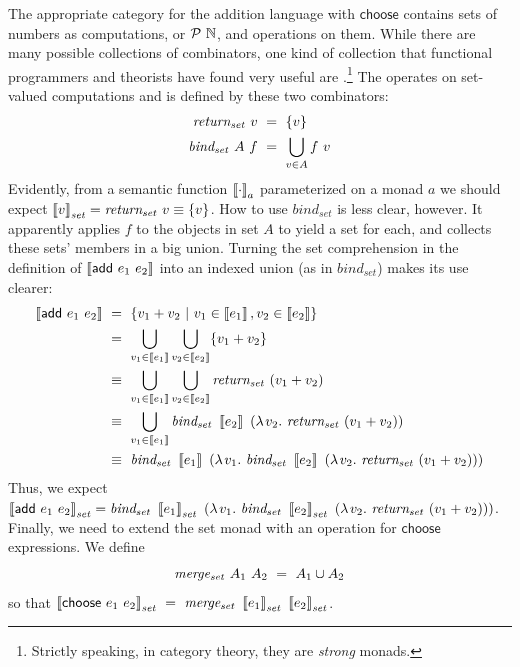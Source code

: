 The appropriate category for the addition language with $\mathsf{choose}$ contains sets of numbers as computations, or $\mathcal{P}~\mathbb{N}$, and operations on them.
While there are many possible collections of combinators, one kind of collection that functional programmers and theorists have found very useful are .\footnote{Strictly speaking, in category theory, they are \emph{strong} monads.}
The  operates on set-valued computations and is defined by these two combinators:
\begin{equation}
\begin{aligned}
	\mathit{return_{set}}~v&\ =\ \{{v}\} \\
	\mathit{bind_{set}}~A~f&\ =\ \bigcup_{v \in A} f~v
\end{aligned}
\end{equation}
Evidently, from a semantic function $\left\llbracket{\cdot}\right\rrbracket_a$ parameterized on a monad $a$ we should expect $\left\llbracket{v}\right\rrbracket_\mathit{set} = \mathit{return_{set}}~v \equiv \{{v}\}$.
How to use $\mathit{bind_{set}}$ is less clear, however.
It apparently applies $f$ to the objects in set $A$ to yield a set for each, and collects these sets' members in a big union.
Turning the set comprehension in the definition of $\left\llbracket{\mathsf{add}~e_1~e_2}\right\rrbracket$ into an indexed union (as in $\mathit{bind_{set}}$) makes its use clearer:
\begin{equation}
\begin{aligned}
	\left\llbracket{\mathsf{add}~e_1~e_2}\right\rrbracket
	&\ =\ \lbrace {v_1 + v_2} \ \lvert\ {v_1 \in \left\llbracket{e_1}\right\rrbracket, v_2 \in \left\llbracket{e_2}\right\rrbracket} \rbrace
\\
	&\ =\ \bigcup_{v_1 \in \left\llbracket{e_1}\right\rrbracket} \bigcup_{v_2 \in \left\llbracket{e_2}\right\rrbracket} \{{v_1 + v_2}\}
\\
	&\ \equiv\ \bigcup_{v_1 \in \left\llbracket{e_1}\right\rrbracket} \bigcup_{v_2 \in \left\llbracket{e_2}\right\rrbracket} \mathit{return_{set}}~(v_1 + v_2)
\\
	&\ \equiv\ \bigcup_{v_1 \in \left\llbracket{e_1}\right\rrbracket} \mathit{bind_{set}}~\left\llbracket{e_2}\right\rrbracket~(\lambda\mspace{2mu}{v_2}\ldotp\, \mathit{return_{set}}~(v_1 + v_2))
\\
	&\ \equiv\ \mathit{bind_{set}}~\left\llbracket{e_1}\right\rrbracket~(\lambda\mspace{2mu}{v_1}\ldotp\, \mathit{bind_{set}}~\left\llbracket{e_2}\right\rrbracket~(\lambda\mspace{2mu}{v_2}\ldotp\, \mathit{return_{set}}~(v_1 + v_2)))
\end{aligned}
\end{equation}
Thus, we expect $\left\llbracket{\mathsf{add}~e_1~e_2}\right\rrbracket_\mathit{set} = \mathit{bind_{set}}~\left\llbracket{e_1}\right\rrbracket_\mathit{set}~(\lambda\mspace{2mu}{v_1}\ldotp\, \mathit{bind_{set}}~\left\llbracket{e_2}\right\rrbracket_\mathit{set}~(\lambda\mspace{2mu}{v_2}\ldotp\, \mathit{return_{set}}~(v_1 + v_2)))$.
Finally, we need to extend the set monad with an operation for $\mathsf{choose}$ expressions.
We define
\begin{equation}
	\mathit{merge_{set}}~A_1~A_2\ =\ A_1 \cup A_2
\end{equation}
so that $\meaningof{\mathsf{choose}~e_1~e_2}_\mathit{set}\ =\ \mathit{merge_{set}}~\meaningof{e_1}_\mathit{set}~\meaningof{e_2}_\mathit{set}$.

